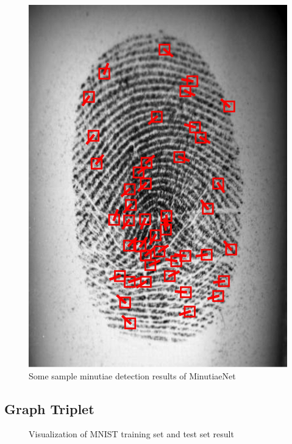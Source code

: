 \begin{figure}[htbp]
    \includegraphics[width=\figwidth\linewidth]{fig/minutiaenet/5.jpg}
    \caption{Some sample minutiae detection results of MinutiaeNet \cite{NguyenICB2018}}
    \label{fig:minutiaenet-results}
\end{figure}





\subsection{Graph Triplet}

\begin{figure}[htb]
    \begin{minipage}[b]{0.48\linewidth}
        \centering
        \centerline{}
    \end{minipage}
    \hfill
    \begin{minipage}[b]{0.48\linewidth}
        \centering
        \centerline{}
    \end{minipage}
    \caption{Visualization of MNIST training set and test set result}
    \label{fig:mnist_plot}
\end{figure}

